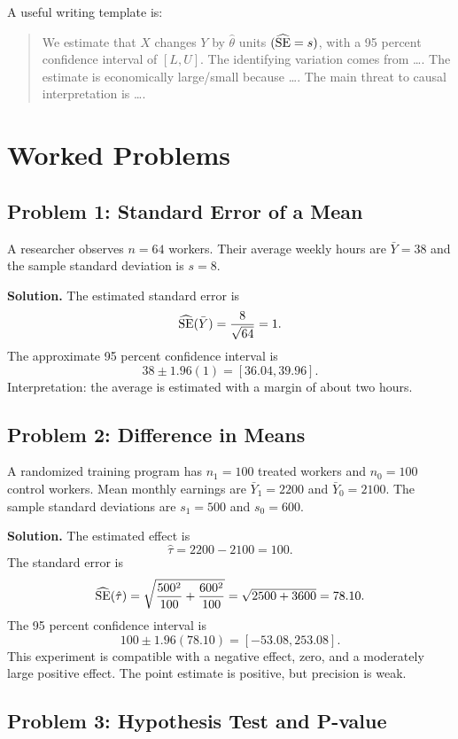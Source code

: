 A useful writing template is:
\begin{quote}
We estimate that $X$ changes $Y$ by $\hat{\theta}$ units
$(\widehat{\mathrm{SE}}=s)$, with a 95 percent confidence interval of $[L,U]$. The
identifying variation comes from \ldots. The estimate is economically
large/small because \ldots. The main threat to causal interpretation is
\ldots.
\end{quote}

\section{Worked Problems}

\subsection{Problem 1: Standard Error of a Mean}

A researcher observes $n=64$ workers. Their average weekly hours are
$\bar{Y}=38$ and the sample standard deviation is $s=8$.

\textbf{Solution.} The estimated standard error is
\[
  \widehat{\mathrm{SE}}(\bar{Y})=\frac{8}{\sqrt{64}}=1.
\]
The approximate 95 percent confidence interval is
\[
  38 \pm 1.96(1) = [36.04,39.96].
\]
Interpretation: the average is estimated with a margin of about two hours.

\subsection{Problem 2: Difference in Means}

A randomized training program has $n_1=100$ treated workers and $n_0=100$
control workers. Mean monthly earnings are $\bar{Y}_1=2200$ and
$\bar{Y}_0=2100$. The sample standard deviations are $s_1=500$ and $s_0=600$.

\textbf{Solution.} The estimated effect is
\[
  \hat{\tau}=2200-2100=100.
\]
The standard error is
\[
  \widehat{\mathrm{SE}}(\hat{\tau})
  =
  \sqrt{\frac{500^2}{100}+\frac{600^2}{100}}
  =
  \sqrt{2500+3600}
  =
  78.10.
\]
The 95 percent confidence interval is
\[
  100 \pm 1.96(78.10)
  =
  [-53.08,253.08].
\]
This experiment is compatible with a negative effect, zero, and a moderately
large positive effect. The point estimate is positive, but precision is weak.

\subsection{Problem 3: Hypothesis Test and P-value}

